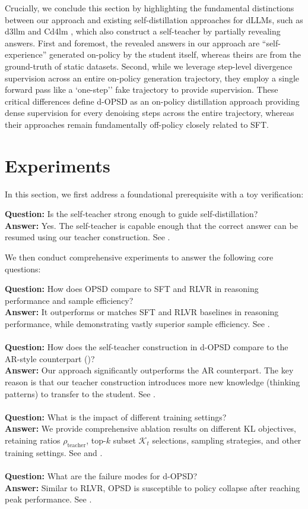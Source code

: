 \documentclass{llmxive}
\providecommand{\question}[2]{\begin{tcolorbox}[
    enhanced,
    colback=white,
    colframe=white,
    leftrule=0.4mm,
    rightrule=0.4mm,
    toprule=0.4mm,
    bottomrule=0.4mm,
    arc=0mm,
    left=0pt,
    right=0pt,
    top=2pt,
    bottom=2pt,
    breakable,
    borderline north={0.4mm}{0pt}{myblue},
    borderline south={0.4mm}{0pt}{myblue}
]
{\textbf{Question:}} #1 \\
{\textbf{Answer:}} #2
\end{tcolorbox}
}
\providecommand{\multiquestion}[8]{\begin{tcolorbox}[
    enhanced,
    colback=white,
    colframe=white,
    leftrule=0.4mm,
    rightrule=0.4mm,
    toprule=0.4mm,
    bottomrule=0.4mm,
    arc=0mm,
    left=0pt,
    right=0pt,
    top=2pt,
    bottom=2pt,
    breakable,
    borderline north={0.4mm}{0pt}{myblue},
    borderline south={0.4mm}{0pt}{myblue}
]
{\textbf{Question:}} #1 \\
{\textbf{Answer:}} #2 \\
\\
{\textbf{Question:}} #3 \\
{\textbf{Answer:}} #4 \\
\\
{\textbf{Question:}} #5 \\
{\textbf{Answer:}} #6 \\
\\
{\textbf{Question:}} #7 \\
{\textbf{Answer:}} #8
\end{tcolorbox}
}
\begin{document}
Crucially, we conclude this section by highlighting the fundamental distinctions between our approach and existing self-distillation approaches for dLLMs, such as d3llm \citep{qian2026d3llm} and Cd4lm \citep{liang2026cd4lm}, which also construct a self-teacher by partially revealing answers. First and foremost, the revealed answers in our approach are ``self-experience'' generated on-policy by the student itself, whereas theirs are from the ground-truth of static datasets. Second, while we leverage step-level divergence supervision across an entire on-policy generation trajectory, they employ a single forward pass like a `one-step'' fake trajectory to provide supervision. These critical differences define d-OPSD as an on-policy distillation approach providing dense supervision for every denoising steps across the entire trajectory, whereas their approaches remain fundamentally off-policy closely related to SFT.


\section{Experiments}


In this section, we first address a foundational prerequisite with a toy verification:

\question{Is the self-teacher strong enough to guide self-distillation?}{Yes. The self-teacher is capable enough that the correct answer can be resumed using our teacher construction. See \Cref{sec4.1}.}

We then conduct comprehensive experiments to answer the following core questions:

\multiquestion{How does OPSD compare to SFT and RLVR in reasoning performance and sample efficiency?}{It outperforms or matches SFT and RLVR baselines in reasoning performance, while demonstrating vastly superior sample efficiency. See \Cref{sec4.2}.}
{How does the self-teacher construction in d-OPSD compare to the AR-style counterpart (\Cref{fig2})?}{Our approach significantly outperforms the AR counterpart. The key reason is that our teacher construction introduces more new knowledge (thinking patterns) to transfer to the student. See \Cref{sec4.3}.}
{What is the impact of different training settings?}{We provide comprehensive ablation results on different KL objectives, retaining ratios $\rho_\text{teacher}$, top-$k$ subset $\mathcal{K}_t$ selections, sampling strategies, and other training settings. See \Cref{sec4.4} and \Cref{app5.1}.}
{What are the failure modes for d-OPSD?}{Similar to RLVR,  OPSD is susceptible to policy collapse after reaching peak performance. See \Cref{sec4.5}.}
\end{document}
